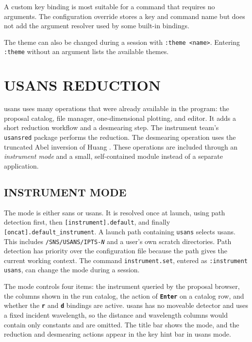 \documentclass[tm]{ornltm}
\newcommand{\key}[1]{\textbf{\texttt{#1}}}
\begin{document}
A custom key binding is most suitable for a command that requires no arguments.
The configuration override stores a key and command name but does not add the
argument resolver used by some built-in bindings.

The theme can also be changed during a session with
\texttt{:theme <name>}. Entering \texttt{:theme} without an argument lists the
available themes.

\section{USANS REDUCTION}
\label{sec:usans}

\Ac{usans} uses many operations that were already available in the program: the
proposal catalog, file manager, one-dimensional plotting, and editor. It adds a
short reduction workflow and a desmearing step. The instrument team's
\texttt{usansred} package performs the reduction. The desmearing operation uses
the truncated Abel inversion of Huang \autocite{huang2026abel}. These operations
are included through an \emph{instrument mode} and a small, self-contained
module instead of a separate application.

\subsection{INSTRUMENT MODE}

The mode is either \ac{sans} or \ac{usans}. It is resolved once at launch, using
path detection first, then \texttt{[instrument].default}, and finally
\texttt{[oncat].default\_instrument}. A launch path containing
\texttt{usans} selects \ac{usans}. This includes
\texttt{/SNS/USANS/IPTS-\textit{N}} and a user's own scratch directories. Path
detection has priority over the configuration file because the path gives the
current working context. The command \texttt{instrument.set}, entered as
\texttt{:instrument usans}, can change the mode during a session.

The mode controls four items: the instrument queried by the proposal browser,
the columns shown in the run catalog, the action of \key{Enter} on a catalog
row, and whether the \key{r} and \key{d} bindings are active. \Ac{usans} has no moveable
detector and uses a fixed incident wavelength, so the distance and wavelength
columns would contain only constants and are omitted. The title bar shows the
mode, and the reduction and desmearing actions appear in the key hint bar in
\ac{usans} mode.
\end{document}
